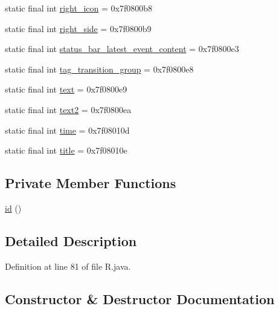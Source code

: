 \begin{DoxyCompactItemize}
static final int \mbox{\hyperlink{classandroid_1_1support_1_1mediacompat_1_1_r_1_1id_aef3074f375f1b5f9ff46fd31dc8b9dd8}{right\+\_\+icon}} = 0x7f0800b8
\item 
static final int \mbox{\hyperlink{classandroid_1_1support_1_1mediacompat_1_1_r_1_1id_a4dda28736626841361621768676f8cc5}{right\+\_\+side}} = 0x7f0800b9
\item 
static final int \mbox{\hyperlink{classandroid_1_1support_1_1mediacompat_1_1_r_1_1id_a1d6982da9abf7a38d286554e24eb056a}{status\+\_\+bar\+\_\+latest\+\_\+event\+\_\+content}} = 0x7f0800e3
\item 
static final int \mbox{\hyperlink{classandroid_1_1support_1_1mediacompat_1_1_r_1_1id_a9bdc2a1b5e3044ae4478cdaf8ecdf1c5}{tag\+\_\+transition\+\_\+group}} = 0x7f0800e8
\item 
static final int \mbox{\hyperlink{classandroid_1_1support_1_1mediacompat_1_1_r_1_1id_a27977888343c802d53fd8e31094c4d46}{text}} = 0x7f0800e9
\item 
static final int \mbox{\hyperlink{classandroid_1_1support_1_1mediacompat_1_1_r_1_1id_af89db6d57c69dfd896242a53693866c9}{text2}} = 0x7f0800ea
\item 
static final int \mbox{\hyperlink{classandroid_1_1support_1_1mediacompat_1_1_r_1_1id_af3ae580d9965637cb4e92633f0d964ee}{time}} = 0x7f08010d
\item 
static final int \mbox{\hyperlink{classandroid_1_1support_1_1mediacompat_1_1_r_1_1id_a6040b8dfeb6da7cd9778754e38ed9bb3}{title}} = 0x7f08010e
\end{DoxyCompactItemize}
\subsection*{Private Member Functions}
\begin{DoxyCompactItemize}
\item 
\mbox{\hyperlink{classandroid_1_1support_1_1mediacompat_1_1_r_1_1id_a16ebb1a63a294ec36cdb009f5488fae0}{id}} ()
\end{DoxyCompactItemize}


\subsection{Detailed Description}


Definition at line 81 of file R.\+java.



\subsection{Constructor \& Destructor Documentation}
\mbox{\label{classandroid_1_1support_1_1mediacompat_1_1_r_1_1id_a16ebb1a63a294ec36cdb009f5488fae0}} 
